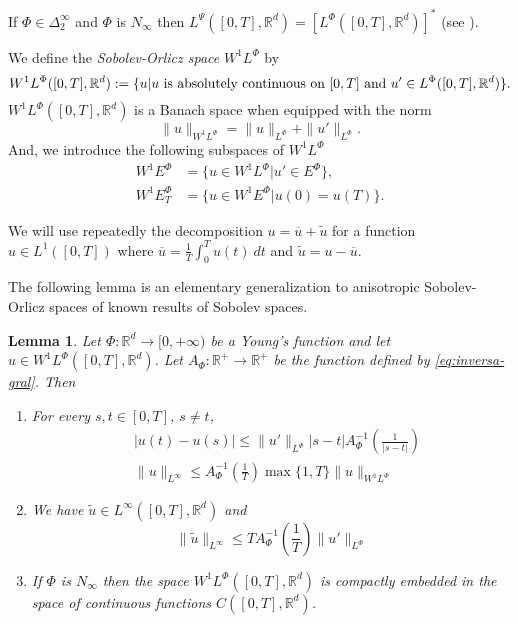 \documentclass[twoside]{article}
\newtheorem{lem}[thm]{Lemma}
\theoremstyle{remark}
\newcommand{\orlnor}{\|_{L^{\Phi}}}
\newcommand{\linf}{\|_{L^{\infty}}}
\newcommand{\lphi}{L^{\Phi}}
\newcommand{\lpsi}{L^{\Psi}}
\newcommand{\ephi}{E^{\Phi}}
\newcommand{\wphi}{W^{1}\lphi}
\newcommand{\wphie}{W^{1}\ephi}
\newcommand{\sobnor}{\|_{W^{1}\lphi}}
\newcommand{\rr}{\mathbb{R}}
\renewcommand{\leq}{\leqslant}
\begin{document}
 If $\Phi \in \Delta_2^{\infty}$ and $\Phi$ is $N_{\infty}$ then $\lpsi([0,T],\rr^d)= \left[\lphi([0,T],\rr^d)\right]^*$  (see \cite[Thm. 2.9 , Thm. 2.10]{Desch2001}).





We define the \emph{Sobolev-Orlicz space} $\wphi$ by
\[\wphi([0,T],\rr^d):=\{u| u \hbox{ is absolutely continuous on $[0,T]$ and } u'\in \lphi([0,T],\rr^d)\}.\]
$\wphi([0,T],\rr^d)$ is a Banach space when equipped with the norm
\begin{equation}\label{def-norma-orlicz-sob}
\|  u  \|_{\wphi}= \|  u  \|_{\lphi} + \|u'\orlnor.
\end{equation}
And, we introduce the following subspaces of $\wphi$
\begin{equation}\label{def-esp-orlicz-sob-per}
\begin{split}
\wphie&=\{u\in\wphi|u'\in\ephi\},\\
\wphie_T&=\{u\in\wphie|u(0)=u(T)\}.
\end{split}
\end{equation}

%
%
 We will use repeatedly the decomposition $u=\overline{u}+\widetilde{u}$ for a function $u\in L^1([0,T])$  where $\overline{u} =\frac1T\int_0^T u(t)\ dt$ and $\widetilde{u}=u-\overline{u}$.

 The following lemma is an elementary generalization to anisotropic Sobolev-Orlicz spaces of known results of Sobolev spaces.



\begin{lem}\label{lem:inclusion orlicz} Let $\Phi:\rr^d\to [0,+\infty)$ be a Young's 
function and let $u\in\wphi([0,T],\rr^d)$. Let 
$A_{\Phi}: \rr^+ \to \rr^+$ be the function defined by \eqref{eq:inversa-gral}. Then
\begin{enumerate}
\item\label{inclusion orlicz_item1} For every $s,t\in [0,T]$, $s\neq t$,
\begin{align}
 &|u(t)-u(s)| \leq
 \|u'\orlnor |s-t|A_{\Phi}^{-1}\left(\frac{1}{|s-t|}\right)\tag{Morrey's inequality}\label{in-sob-cont}
\\
& \| u\linf \leq A_\Phi^{-1}\left(\frac{1}{T}\right)\max\{1,T\}\|u\sobnor\tag{Sobolev's inequality}\label{eq:sobolev}
\end{align}
\item We have $\widetilde{u}\in L^{\infty}([0,T],\rr^d)$ and
\[
\|\widetilde u \linf \leq T A_{\Phi}^{-1}\left(\frac{1}{T}\right)\|u'\orlnor
\tag{Sobolev-Wirtinger's inequality}\label{wirtinger}
\]
\item\label{it:embeding} If $\Phi$ is $N_{\infty}$ then the space $\wphi([0,T],\rr^d)$ is compactly embedded in the space of continuous functions $C([0,T],\rr^d)$.
\end{enumerate}
\end{lem}
\end{document}

